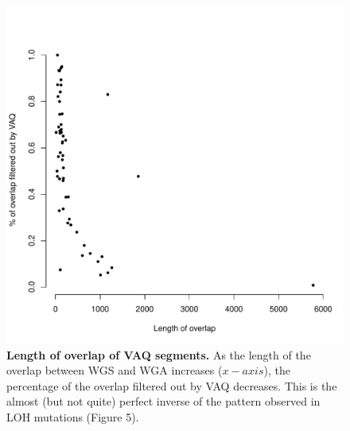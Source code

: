 \documentclass[11pt]{article} %
\begin{document}
\begin{figure}
\centerline{
\includegraphics[width=5in]{./LOH_VAQ/VAQ_all.pdf} }
\caption{ \textbf{Length of overlap of VAQ segments.} As the length of the overlap between WGS and WGA increases ($x-axis$), the percentage of the overlap filtered out by VAQ decreases. This is the almost (but not quite) perfect inverse of the pattern observed in LOH mutations (Figure 5).}
\end{figure}
\end{document}
